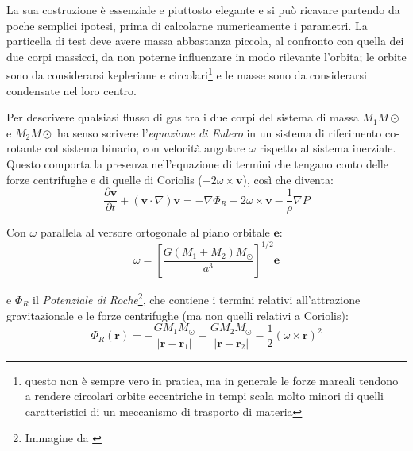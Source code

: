 \documentclass[a4paperbi]{article}
\begin{document}
	La sua costruzione è essenziale e piuttosto elegante e si può ricavare partendo da poche semplici ipotesi, prima di calcolarne numericamente i parametri. La particella di test deve avere massa abbastanza piccola, al confronto con quella dei due corpi massicci, da non poterne influenzare in modo rilevante l'orbita; le orbite sono da considerarsi kepleriane e circolari\footnote{questo non è sempre vero in pratica, ma in generale le forze mareali tendono a rendere circolari orbite eccentriche in tempi scala molto minori di quelli caratteristici di un meccanismo di trasporto di materia} e le masse sono da considerarsi condensate nel loro centro.
	
	Per descrivere qualsiasi flusso di gas tra i due corpi del sistema di massa $M_1M\odot$ e $M_2M\odot$ ha senso scrivere l'\textit{equazione di Eulero} in un sistema di riferimento co-rotante col sistema binario, con velocità angolare $\omega$ rispetto al sistema inerziale. Questo comporta la presenza nell'equazione di termini che tengano conto delle forze centrifughe e di quelle di Coriolis ($-2\omega\times\textbf{v}$), così che diventa:
	\begin{equation}
		\frac{\partial \textbf{v}}{\partial t}+(\textbf{v}\cdot\nabla)\textbf{v}=-\nabla\Phi_R-2\omega\times\textbf{v}-\frac{1}{\rho}\nabla P
	\end{equation}
	
	Con $\omega$ parallela al versore ortogonale al piano orbitale $\textbf{e}$:
	\begin{equation}
		\omega=\left[\frac{G(M_1+M_2)M_\odot}{a^3}\right]^{1/2}\textbf{e}
	\end{equation}
	
	e $\Phi_R$ il \textit{Potenziale di Roche}\footnote{Immagine da \cite{FrankKingRaineAccretionPower}}, che contiene i termini relativi all'attrazione gravitazionale e le forze centrifughe (ma non quelli relativi a Coriolis):
	\begin{equation}
		\Phi_R(\textbf{r})=-\frac{GM_1M_\odot}{\vert\textbf{r}-\textbf{r}_1\vert}-\frac{GM_2M_\odot}{\vert\textbf{r}-\textbf{r}_2\vert}-\frac{1}{2}(\omega\times\textbf{r})^2
	\end{equation}
	
\end{document}
